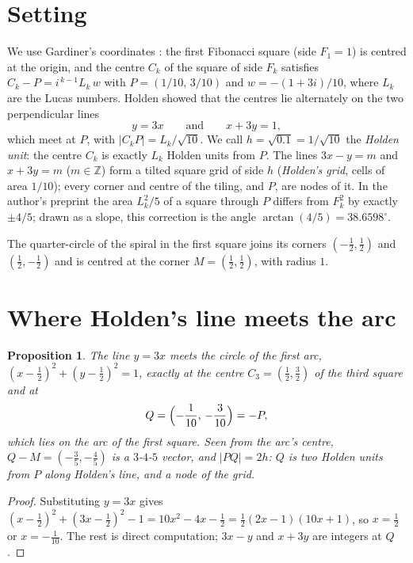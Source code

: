\documentclass[11pt,a4paper]{article}
\theoremstyle{plain}
\newtheorem{proposition}[theorem]{Proposition}
\theoremstyle{definition}
\theoremstyle{remark}
\begin{document}
\section{Setting}

We use Gardiner's coordinates \cite{gardiner}: the first Fibonacci square (side $F_1=1$) is centred at the origin, and the centre $C_k$ of the square of side $F_k$ satisfies $C_k - P = i^{\,k-1} L_k\, w$ with $P=(1/10,\,3/10)$ and $w=-(1+3i)/10$, where $L_k$ are the Lucas numbers. Holden \cite{holden} showed that the centres lie alternately on the two perpendicular lines
\[
  y = 3x \qquad\text{and}\qquad x + 3y = 1,
\]
which meet at $P$, with $|C_kP| = L_k/\sqrt{10}$. We call $h=\sqrt{0.1}=1/\sqrt{10}$ the \emph{Holden unit}: the centre $C_k$ is exactly $L_k$ Holden units from $P$. The lines $3x-y=m$ and $x+3y=m$ ($m\in\mathbb{Z}$) form a tilted square grid of side $h$ (\emph{Holden's grid}, cells of area $1/10$); every corner and centre of the tiling, and $P$, are nodes of it. In the author's preprint \cite{gt} the area $L_k^2/5$ of a square through $P$ differs from $F_k^2$ by exactly $\pm 4/5$; drawn as a slope, this correction is the angle $\arctan(4/5)=38.6598^\circ$.

The quarter-circle of the spiral in the first square joins its corners $(-\tfrac12,\tfrac12)$ and $(\tfrac12,-\tfrac12)$ and is centred at the corner $M=(\tfrac12,\tfrac12)$, with radius $1$.

\section{Where Holden's line meets the arc}

\begin{proposition}\label{prop:Q}
The line $y=3x$ meets the circle of the first arc, $(x-\tfrac12)^2+(y-\tfrac12)^2=1$, exactly at the centre $C_3=(\tfrac12,\tfrac32)$ of the third square and at
\[
  Q=\Bigl(-\frac{1}{10},\,-\frac{3}{10}\Bigr) = -P ,
\]
which lies on the arc of the first square. Seen from the arc's centre, $Q-M=(-\tfrac35,-\tfrac45)$ is a $3$-$4$-$5$ vector, and $|PQ| = 2h$: $Q$ is two Holden units from $P$ along Holden's line, and a node of the grid.
\end{proposition}

\begin{proof}
Substituting $y=3x$ gives $(x-\tfrac12)^2+(3x-\tfrac12)^2-1 = 10x^2-4x-\tfrac12 = \tfrac12(2x-1)(10x+1)$, so $x=\tfrac12$ or $x=-\tfrac1{10}$. The rest is direct computation; $3x-y$ and $x+3y$ are integers at $Q$.
\end{proof}
\end{document}
